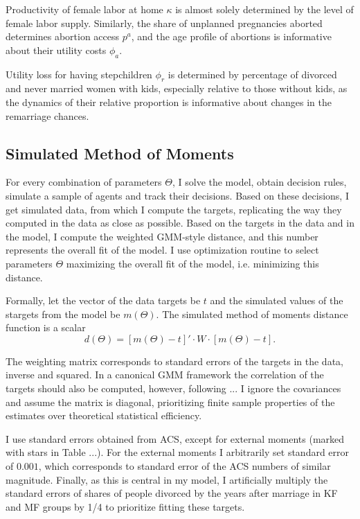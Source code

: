 \documentclass[12pt,letter]{article}
\begin{document}
Productivity of female labor at home $\kappa$ is almost solely determined by the level of female labor supply. Similarly, the share of unplanned pregnancies aborted determines abortion access $p^a$, and the age profile of abortions is informative about their utility costs $\phi_a$.

Utility loss for having stepchildren $\phi_r$ is determined by percentage of divorced and never married women with kids, especially relative to those without kids, as the dynamics of their relative proportion is informative about changes in the remarriage chances.

\subsection{Simulated Method of Moments}

For every combination of parameters $\Theta$, I solve the model, obtain decision rules, simulate a sample of agents and track their decisions. Based on these decisions, I get simulated data, from which I compute the targets, replicating the way they computed in the data as close as possible. Based on the targets in the data and in the model, I compute the weighted GMM-style distance, and this number represents the overall fit of the model. I use optimization routine to select parameters $\Theta$ maximizing the overall fit of the model, i.e. minimizing this distance.

Formally, let the vector of the data targets be $t$ and the simulated values of the stargets from the model be $m(\Theta)$. The simulated method of moments distance function is a scalar
\[d(\Theta) = \left[ m(\Theta) - t\right]' \cdot W \cdot  \left[ m(\Theta) - t\right].\]

The weighting matrix corresponds to standard errors of the targets in the data, inverse and squared. In a canonical GMM framework the correlation of the targets should also be computed, however, following ... I ignore the covariances and assume the matrix is diagonal, prioritizing finite sample properties of the estimates over theoretical statistical efficiency.

I use standard errors obtained from ACS, except for external moments (marked with stars in Table ...). For the external moments I arbitrarily set standard error of $0.001$, which corresponds to standard error of the ACS numbers of similar magnitude. Finally, as this is central in my model, I artificially multiply the standard errors of shares of people divorced by the years after marriage in KF and MF groups by 1/4 to prioritize fitting these targets. 
\end{document}
